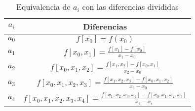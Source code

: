 \begin{table}[!ht]
\begin{huge}
\begin{center}
\begin{tabular}{|c|c|} 
\hline
$a_i$ & Diferencias\\ \hline
$a_0$ & $f[x_0]=f(x_0)$   \\ \hline
$a_1$ & $f[x_0,x_1]=\frac{f[x_1]-f[x_0]}{x_1-x_0}$  \\ \hline
$a_2$ & $f[x_0,x_1,x_2]=\frac{f[x_1,x_2]-f[x_0,x_1]}{x_2-x_0}$  \\ \hline
$a_3$ & $f[x_0,x_1,x_2,x_3]=\frac{f[x_1,x_2,x_3]-f[x_0,x_1,x_2]}{x_3-x_0}$   \\ \hline
$a_4$ & $f[x_0,x_1,x_2,x_3,x_4]=\frac{f[x_1,x_2,x_3,x_4]-f[x_0,x_1,x_2,x_3]}{x_4-x_i}$ \\ \hline


\end{tabular}
\end{center}
\end{huge}
\caption{Equivalencia de $a_i$ con las diferencias divididas}
\label{tab}
\end{table}